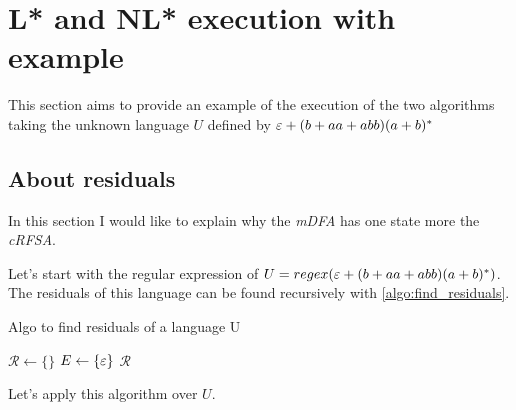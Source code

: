 \section{L* and NL* execution with example}

This section aims to provide an example of the execution of the two algorithms taking the unknown language $U$ defined by $\varepsilon+(b+aa+abb)(a+b)^*$ %



\subsection{About residuals}
In this section I would like to explain why the \textit{mDFA} has one state more the \textit{cRFSA}.



\begin{algorithm}[H]Let's start with the regular expression of $U = regex(\varepsilon+(b+aa+abb)(a+b)^*)$. The residuals of this language can be found recursively with \cref{algo:find_residuals}.
  \caption{Algo to find residuals of a language U}
  \label{algo:find_residuals}
  $\mathcal{R} \gets \{\}$ 
  $E \gets \{\varepsilon\}$
  \Return $\mathcal{R}$
\end{algorithm}

Let's apply this algorithm over $U$.


